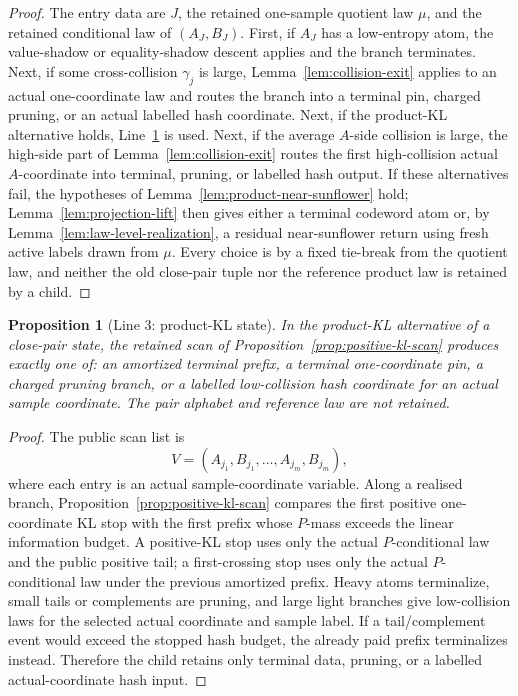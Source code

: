 \documentclass[11pt]{article}
\newtheorem{proposition}[theorem]{Proposition}
\theoremstyle{remark}
\begin{document}
\begin{proof}
The entry data are $J$, the retained one-sample quotient law $\mu$, and the retained conditional law of $(A_J,B_J)$.  First, if $A_J$ has a low-entropy atom, the value-shadow or equality-shadow descent applies and the branch terminates.  Next, if some cross-collision $\gamma_j$ is large, Lemma~\ref{lem:collision-exit} applies to an actual one-coordinate law and routes the branch into a terminal pin, charged pruning, or an actual labelled hash coordinate.  Next, if the product-KL alternative holds, Line~\ref{prop:line-product-kl} is used.  Next, if the average $A$-side collision is large, the high-side part of Lemma~\ref{lem:collision-exit} routes the first high-collision actual $A$-coordinate into terminal, pruning, or labelled hash output.  If these alternatives fail, the hypotheses of Lemma~\ref{lem:product-near-sunflower} hold; Lemma~\ref{lem:projection-lift} then gives either a terminal codeword atom or, by Lemma~\ref{lem:law-level-realization}, a residual near-sunflower return using fresh active labels drawn from $\mu$.  Every choice is by a fixed tie-break from the quotient law, and neither the old close-pair tuple nor the reference product law is retained by a child.
\end{proof}

\begin{proposition}[Line 3: product-KL state]\label{prop:line-product-kl}
In the product-KL alternative of a close-pair state, the retained scan of Proposition~\ref{prop:positive-kl-scan} produces exactly one of: an amortized terminal prefix, a terminal one-coordinate pin, a charged pruning branch, or a labelled low-collision hash coordinate for an actual sample coordinate.  The pair alphabet and reference law are not retained.
\end{proposition}

\begin{proof}
The public scan list is
\[
        V=(A_{j_1},B_{j_1},\ldots,A_{j_m},B_{j_m}),
\]
where each entry is an actual sample-coordinate variable.  Along a realised branch, Proposition~\ref{prop:positive-kl-scan} compares the first positive one-coordinate KL stop with the first prefix whose $P$-mass exceeds the linear information budget.  A positive-KL stop uses only the actual $P$-conditional law and the public positive tail; a first-crossing stop uses only the actual $P$-conditional law under the previous amortized prefix.  Heavy atoms terminalize, small tails or complements are pruning, and large light branches give low-collision laws for the selected actual coordinate and sample label.  If a tail/complement event would exceed the stopped hash budget, the already paid prefix terminalizes instead.  Therefore the child retains only terminal data, pruning, or a labelled actual-coordinate hash input.
\end{proof}
\end{document}
